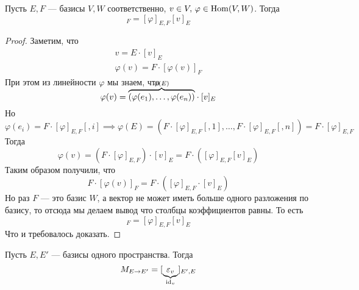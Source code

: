 \documentclass[../main.tex]{subfiles}
\begin{document}
\begin{theorem-non}
\label{non:7.2}
  Пусть $E, F$ --- базисы $V, W$ соответственно, $v \in V,\, \varphi \in \operatorname{Hom}(V, W)$.
  Тогда
  \begin{equation*}
    [\varphi(v)]_F = [\varphi]_{E, F} [v]_E
  \end{equation*}
\end{theorem-non}
\begin{proof}
  Заметим, что
  \begin{equation*}
    \begin{gathered}
      v = E \cdot [v]_E  \\
      \varphi(v) = F \cdot [\varphi(v)]_F
    \end{gathered}
  \end{equation*}
  При этом из линейности $\varphi$ мы знаем, что
  \begin{equation*}
    \varphi(v) =
    \smash{\overbrace{(\varphi(e_1), \dotsc, \varphi(e_n))}^{\mathclap{\varphi(E)}}}
    \cdot [v]_E
  \end{equation*}
  Но
  \begin{equation*}
    \varphi(e_i) = F \cdot [\varphi]_{E, F}[,i]
    \implies
    \varphi(E)
    =
    (F \cdot [\varphi]_{E, F}[,1], \dotsc, F \cdot [\varphi]_{E, F}[,n])
    =
    F \cdot [\varphi]_{E, F}
  \end{equation*}
  Тогда
  \begin{equation*}
    \varphi(v)
    =
    (F \cdot [\varphi]_{E, F}) \cdot [v]_E
    =
    F \cdot ([\varphi]_{E, F}[v]_{E})
  \end{equation*}
  Таким образом получили, что
  \begin{equation*}
    F \cdot [\varphi(v)]_F = F \cdot ([\varphi]_{E, F} \cdot [v]_E)
  \end{equation*}
  Но раз $F$ --- это базис $W$, а вектор не может иметь больше одного разложения по базису, то отсюда мы делаем вывод что столбцы коэффициентов равны. То есть
  \begin{equation*}
    [\varphi(v)]_F = [\varphi]_{E, F}[v]_E
  \end{equation*}
  Что и требовалось доказать.
\end{proof}

\begin{remark}
  Пусть $E, E'$ --- базисы одного пространства. Тогда
  \begin{equation*}
    M_{E\to E'} = [\underbrace{\varepsilon_v}_{\mathclap{\id_v}}]_{E',E}
  \end{equation*}
\end{remark}
\end{document}
